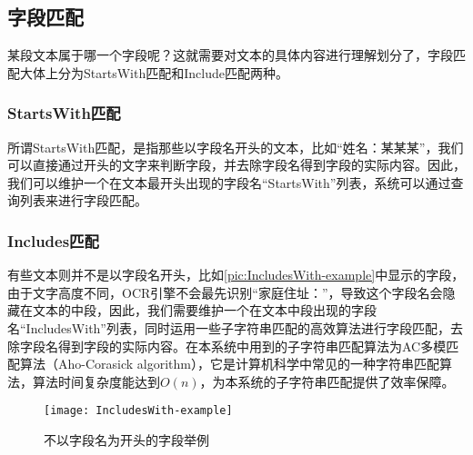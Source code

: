\subsection{字段匹配}
某段文本属于哪一个字段呢？这就需要对文本的具体内容进行理解划分了，字段匹配大体上分为StartsWith匹配和Include匹配两种。
\subsubsection*{StartsWith匹配}
所谓StartsWith匹配，是指那些以字段名开头的文本，比如“姓名：某某某”，我们可以直接通过开头的文字来判断字段，并去除字段名得到字段的实际内容。因此，我们可以维护一个在文本最开头出现的字段名“StartsWith”列表，系统可以通过查询列表来进行字段匹配。
\subsubsection*{Includes匹配}
有些文本则并不是以字段名开头，比如\autoref{pic:IncludesWith-example}中显示的字段，由于文字高度不同，OCR引擎不会最先识别“家庭住址：”，导致这个字段名会隐藏在文本的中段，因此，我们需要维护一个在文本中段出现的字段名“IncludesWith”列表，同时运用一些子字符串匹配的高效算法进行字段匹配，去除字段名得到字段的实际内容。在本系统中用到的子字符串匹配算法为AC多模匹配算法（Aho-Corasick algorithm）\citep{aho1975efficient}，它是计算机科学中常见的一种字符串匹配算法，算法时间复杂度能达到$O(n)$，为本系统的子字符串匹配提供了效率保障。
\begin{figure}[htbp]
	\centering
	\caption{不以字段名为开头的字段举例}
	\texttt{[image: IncludesWith-example]}
	\label{pic:IncludesWith-example}
\end{figure}



